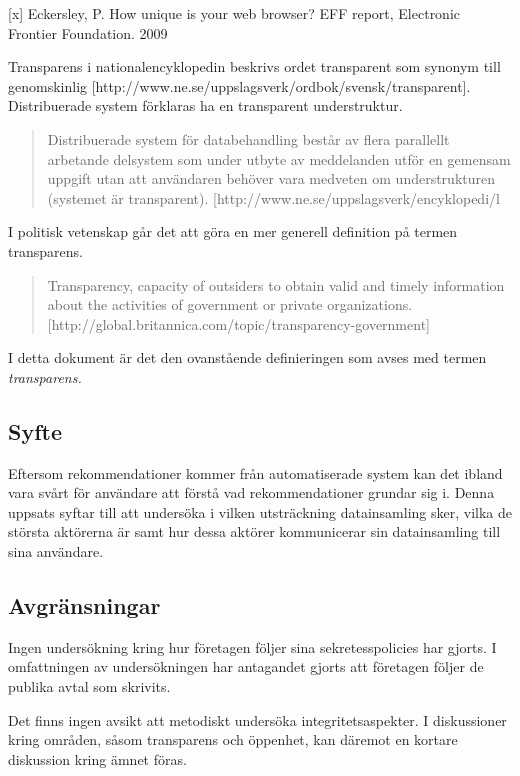 \documentclass[a4paper,11pt]{article}
\begin{document}
{[x] Eckersley, P. How unique is your web browser? EFF report, Electronic Frontier Foundation. 2009

Transparens i nationalencyklopedin beskrivs ordet transparent som synonym till genomskinlig [http://www.ne.se/uppslagsverk/ordbok/svensk/transparent]. Distribuerade system förklaras ha en transparent understruktur.

\begin{quote}
Distribuerade system för databehandling består av flera parallellt arbetande delsystem som under utbyte av meddelanden utför en gemensam uppgift utan att användaren behöver vara medveten om understrukturen (systemet är transparent). [http://www.ne.se/uppslagsverk/encyklopedi/l%
\end{quote}

I politisk vetenskap går det att göra en mer generell definition på termen transparens. 

\begin{quote}
Transparency, capacity of outsiders to obtain valid and timely information about the activities of government or private organizations.
[http://global.britannica.com/topic/transparency-government]
\end{quote}
I detta dokument är det den ovanstående definieringen som avses med termen \textit{transparens.}

\subsection{Syfte}
Eftersom rekommendationer kommer från automatiserade system kan det ibland vara svårt för användare att förstå vad rekommendationer grundar sig i. Denna uppsats syftar till att undersöka i vilken utsträckning datainsamling sker, vilka de största aktörerna är samt hur dessa aktörer kommunicerar sin datainsamling till sina användare.

\subsection{Avgränsningar}
Ingen undersökning kring hur företagen följer sina sekretesspolicies har gjorts. I omfattningen av undersökningen har antagandet gjorts att företagen följer de publika avtal som skrivits. 

Det finns ingen avsikt att metodiskt undersöka integritetsaspekter. I diskussioner kring områden, såsom transparens och öppenhet, kan däremot en kortare diskussion kring ämnet föras.

}
\end{document}
